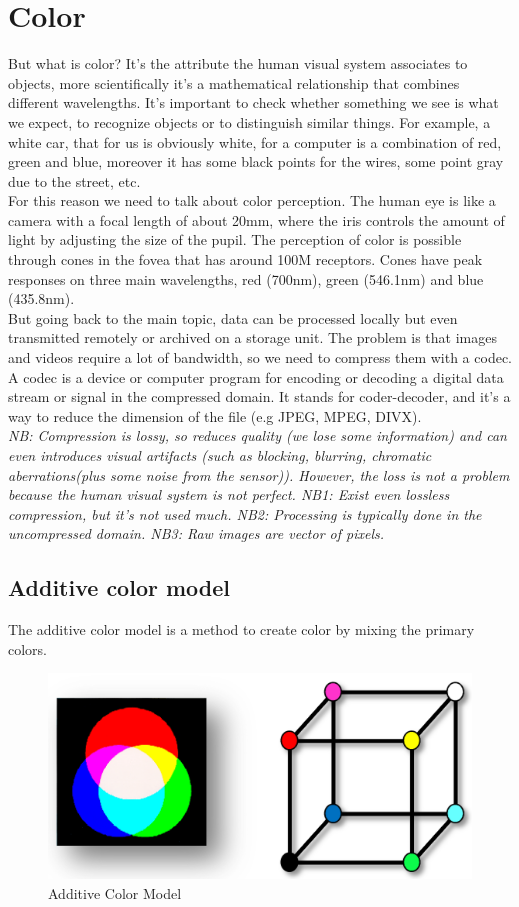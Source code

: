 \section{Color}
But what is color? It's the attribute the human visual system associates to objects, more scientifically it's a mathematical relationship that combines different wavelengths. 
It's important to check whether something we see is what we expect, to recognize objects or to distinguish similar things. For example, a white car, that for us is obviously white, for a computer is a combination of red, green and blue, moreover it has some black points for the wires, some point gray due to the street, etc.
\\For this reason we need to talk about color perception. The human eye is like a camera with a focal length of about 20mm, where the iris controls the amount of light by adjusting the size of the pupil. 
The perception of color is possible through cones in the fovea that has around 100M receptors.  Cones have peak responses on three main wavelengths, red (700nm), green (546.1nm) and blue (435.8nm).
\\
But going back to the main topic, data can be processed locally but even transmitted remotely or archived on a storage unit. The problem is that images and videos require a lot of bandwidth, so we need to compress them with a codec.
A codec is a device or computer program for encoding or decoding a digital data stream or signal in the compressed domain. It stands for coder-decoder, and it's a way to reduce the dimension of the file (e.g JPEG, MPEG, DIVX). 
\\\textit{NB: Compression is lossy, so reduces quality (we lose some information) and can even introduces visual artifacts (such as blocking, blurring, chromatic aberrations(plus some noise from the sensor)). However, the loss is not a problem because the human visual system is not perfect.
NB1: Exist even lossless compression, but it's not used much.
NB2: Processing is typically done in the uncompressed domain. 
NB3: Raw images are vector of pixels.
}
\subsection{Additive color model}
The additive color model is a method to create color by mixing the primary colors.
\begin{figure}[h]
    \centering
    \includegraphics[scale=0.5]{Figures/AdditiveModel.png}
    \caption{Additive Color Model}
    \label{fig:enter-label}
\end{figure}

